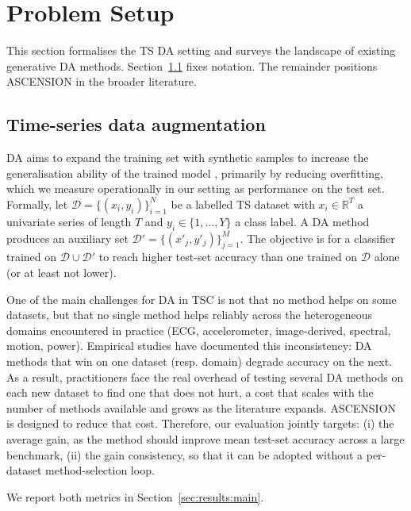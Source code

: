 \section{Problem Setup}
\label{sec:setup}

This section formalises the TS DA setting and surveys the landscape of existing generative DA methods.
Section~\ref{sec:setup:ts-da} fixes notation. The remainder
positions ASCENSION in the broader literature.

\subsection{Time-series data augmentation}
\label{sec:setup:ts-da}
 DA aims to expand the training set with synthetic samples to increase the generalisation ability of the trained model \citep{shorten2019survey}, primarily by
  reducing overfitting, which we measure operationally in our setting as performance on the test set. Formally, let $\mathcal{D} = \{(x_i, y_i)\}_{i=1}^{N}$ be a labelled  
  TS dataset with $x_i \in \mathbb{R}^{T}$ a univariate
  series of length $T$ and $y_i \in \{1, \ldots, Y\}$ a class label.  
  A DA method produces an auxiliary set  
  $\mathcal{D}' = \{(x'_j, y'_j)\}_{j=1}^{M}$. The objective
  is for a classifier trained on $\mathcal{D} \cup \mathcal{D}'$ to 
  reach higher test-set accuracy than one trained on $\mathcal{D}$
  alone (or at least not lower). 
  
  One of the main challenges for DA in TSC is not that no
  method helps on some datasets, but that no single
  method helps reliably across the heterogeneous domains  
  encountered in practice (ECG, accelerometer, image-derived,
  spectral, motion, power). Empirical studies 
  \citep{iwana2021empirical, iglesias2023data} have
  documented this inconsistency: DA methods that win on one
  dataset (resp. domain) degrade accuracy on the next. As a  
  result, practitioners face the real overhead of testing several 
  DA methods on each new dataset to find one that does not hurt, a
  cost that scales with the number of methods available and grows 
  as the literature expands. ASCENSION is designed to reduce that 
  cost. Therefore, our evaluation jointly targets: (i) the average gain, as the method should improve mean test-set accuracy across a large benchmark, (ii) the gain consistency, so that it can be adopted without a per-dataset method-selection loop.  

  We report both metrics in Section~\ref{sec:results:main}. 
  

